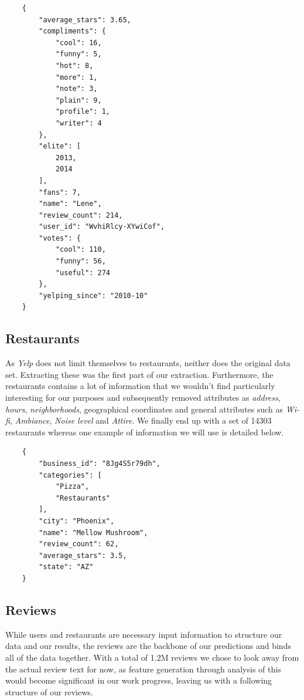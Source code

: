 \documentclass[10pt,twocolumn,letterpaper]{article}
\begin{document}
\begin{verbatim}
	{
        "average_stars": 3.65,
        "compliments": {
            "cool": 16,
            "funny": 5,
            "hot": 8,
            "more": 1,
            "note": 3,
            "plain": 9,
            "profile": 1,
            "writer": 4
        },
        "elite": [
            2013,
            2014
        ],
        "fans": 7,
        "name": "Lene",
        "review_count": 214,
        "user_id": "WvhiRlcy-XYwiCof",
        "votes": {
            "cool": 110,
            "funny": 56,
            "useful": 274
        },
        "yelping_since": "2010-10"
    }
\end{verbatim}

\subsection{Restaurants}
As \textit{Yelp} does not limit themselves to restaurants, neither does the original data set. Extracting these was the first part of our extraction. Furthermore, the restaurants contains a lot of information that we wouldn't find particularly interesting for our purposes and subsequently removed attributes as \textit{address}, \textit{hours}, \textit{neighborhoods}, geographical coordinates and general attributes such as \textit{Wi-fi}, \textit{Ambiance}, \textit{Noise level} and \textit{Attire}. We finally end up with a set of 14303 restaurants whereas one example of information we will use is detailed below.

\begin{verbatim}
	{
	    "business_id": "8Jg4S5r79dh",
	    "categories": [
	        "Pizza",
	        "Restaurants"
	    ],
	    "city": "Phoenix",
	    "name": "Mellow Mushroom",
	    "review_count": 62,
	    "average_stars": 3.5,
	    "state": "AZ"
	}
\end{verbatim}

\subsection{Reviews}
While users and restaurants are necessary input information to structure our data and our results, the reviews are the backbone of our predictions and binds all of the data together. With a total of 1.2M reviews we chose to look away from the actual review text for now, as feature generation through analysis of this would become significant in our work progress, leaving us with a following structure of our reviews.
\end{document}
